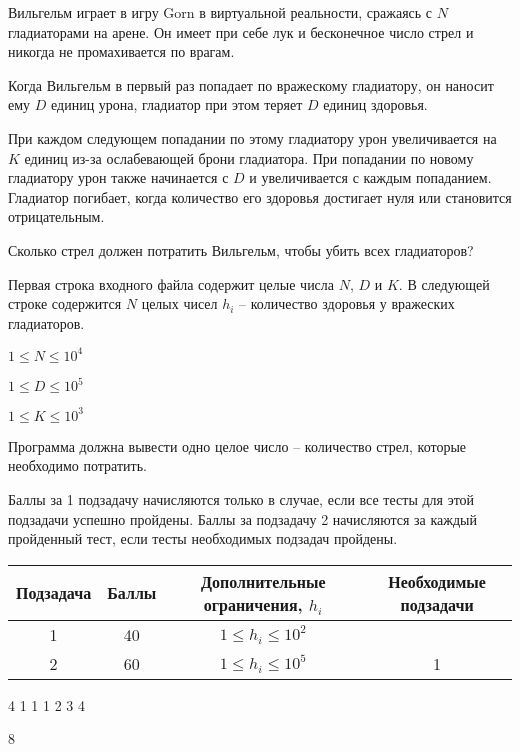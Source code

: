 
Вильгельм играет в игру Gorn в виртуальной реальности, сражаясь с $N$ гладиаторами на арене. Он имеет при себе лук и бесконечное число стрел и никогда не промахивается по врагам. 

Когда Вильгельм в первый раз попадает по вражескому гладиатору, он наносит ему $D$ единиц урона, гладиатор при этом теряет $D$ единиц здоровья. 

При каждом следующем попадании по этому гладиатору урон увеличивается на $K$ единиц из-за ослабевающей брони гладиатора. При попадании по новому гладиатору урон также начинается с $D$ и увеличивается с каждым попаданием. Гладиатор погибает, когда количество его здоровья достигает нуля или становится отрицательным. 

Сколько стрел должен потратить Вильгельм, чтобы убить всех гладиаторов?


Первая строка входного файла содержит целые числа $N$, $D$ и $K$. В следующей строке содержится $N$ целых чисел $h_i$ -- количество здоровья у вражеских гладиаторов.

$1\leq N \leq 10^4$

$1\leq D \leq 10^5$

$1\leq K \leq 10^3$

\outputfmtSection

Программа должна вывести одно целое число -- количество стрел, которые необходимо потратить.

\markSection

Баллы за 1 подзадачу начисляются только в случае, если все тесты для этой подзадачи успешно пройдены. Баллы за подзадачу 2 начисляются за каждый пройденный тест, если тесты необходимых подзадач пройдены.

\begin{table}[H]
    \begin{center}
    \begin{tabular}{|c|c|c|c|}
    \hline
    Подзадача & Баллы & Дополнительные ограничения, $h_i$ & Необходимые подзадачи \\
    \hline
    1 & 40 & $1\leq h_i \leq 10^2$& \\
    \hline
    2 & 60 & $1\leq h_i \leq 10^5$ & 1 \\
    \hline
    
    \end{tabular}
    \end{center}
\end{table} 


\begin{myverbbox}[\small]{\vinput}
    4 1 1
    1 2 3 4
\end{myverbbox}
\begin{myverbbox}[\small]{\voutput}
    8
\end{myverbbox}

